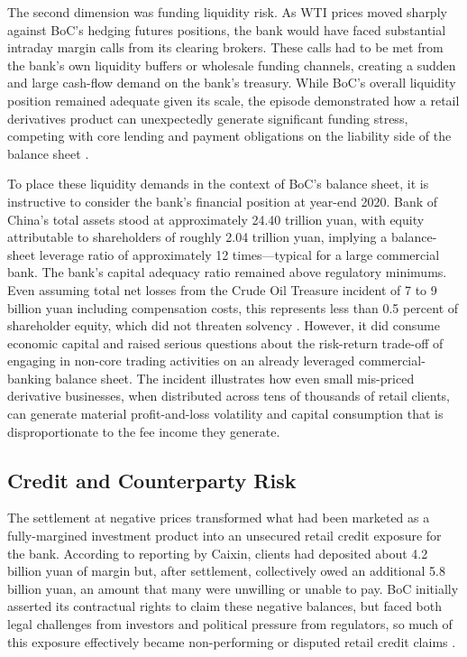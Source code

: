 \documentclass[a4paper,11pt]{article}
\begin{document}
The second dimension was funding liquidity risk. As WTI prices moved
sharply against BoC's hedging futures positions, the bank would have
faced substantial intraday margin calls from its clearing brokers.
These calls had to be met from the bank's own liquidity buffers or
wholesale funding channels, creating a sudden and large cash-flow
demand on the bank's treasury. While BoC's overall liquidity position
remained adequate given its scale, the episode demonstrated how a
retail derivatives product can unexpectedly generate significant
funding stress, competing with core lending and payment obligations
on the liability side of the balance sheet \cite{joebm2024analysis}.

To place these liquidity demands in the context of BoC's balance
sheet, it is instructive to consider the bank's financial position at
year-end 2020. Bank of China's total assets stood at approximately
24.40 trillion yuan, with equity attributable to shareholders of
roughly 2.04 trillion yuan, implying a balance-sheet leverage ratio
of approximately 12 times---typical for a large commercial bank. The
bank's capital adequacy ratio remained above regulatory minimums.
Even assuming total net losses from the Crude Oil Treasure incident
of 7 to 9 billion yuan including compensation costs, this represents
less than 0.5 percent of shareholder equity, which did not threaten
solvency \cite{atlantis2021analysis}. However, it did consume
economic capital and raised serious questions about the risk-return
trade-off of engaging in non-core trading activities on an already
leveraged commercial-banking balance sheet. The incident illustrates
how even small mis-priced derivative businesses, when distributed
across tens of thousands of retail clients, can generate material
profit-and-loss volatility and capital consumption that is
disproportionate to the fee income they generate.

\subsection{Credit and Counterparty Risk}

The settlement at negative prices transformed what had been marketed
as a fully-margined investment product into an unsecured retail
credit exposure for the bank. According to reporting by Caixin,
clients had deposited about 4.2 billion yuan of margin but, after
settlement, collectively owed an additional 5.8 billion yuan, an
amount that many were unwilling or unable to pay. BoC initially
asserted its contractual rights to claim these negative balances, but
faced both legal challenges from investors and political pressure
from regulators, so much of this exposure effectively became
non-performing or disputed retail credit claims \cite{caixin2020exclusive}.
\end{document}

